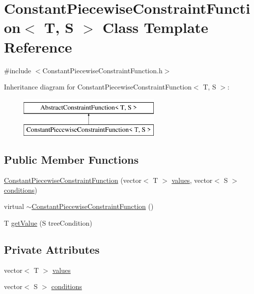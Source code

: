 \hypertarget{class_constant_piecewise_constraint_function}{}\section{Constant\+Piecewise\+Constraint\+Function$<$ T, S $>$ Class Template Reference}
\label{class_constant_piecewise_constraint_function}


{\ttfamily \#include $<$Constant\+Piecewise\+Constraint\+Function.\+h$>$}

Inheritance diagram for Constant\+Piecewise\+Constraint\+Function$<$ T, S $>$\+:\begin{figure}[H]
\begin{center}
\leavevmode
\includegraphics[height=2.000000cm]{d4/d89/class_constant_piecewise_constraint_function}
\end{center}
\end{figure}
\subsection*{Public Member Functions}
\begin{DoxyCompactItemize}
\item 
\hyperlink{class_constant_piecewise_constraint_function_a5f8ebd7b7b8794976f4ddf3a448cd9a6}{Constant\+Piecewise\+Constraint\+Function} (vector$<$ T $>$ \hyperlink{class_constant_piecewise_constraint_function_ae26530a2cd1a3ce9150b68fb16d5423e}{values}, vector$<$ S $>$ \hyperlink{class_constant_piecewise_constraint_function_af28fe38d8c5c4a9a805c8a46d35cd4b2}{conditions})
\item 
virtual \hyperlink{class_constant_piecewise_constraint_function_ab44f248af12827ce5cf528ccf163c2f7}{$\sim$\+Constant\+Piecewise\+Constraint\+Function} ()
\item 
T \hyperlink{class_constant_piecewise_constraint_function_ae44b78e86336e8a45ebac2344d5de8ce}{get\+Value} (S tree\+Condition)
\end{DoxyCompactItemize}
\subsection*{Private Attributes}
\begin{DoxyCompactItemize}
\item 
vector$<$ T $>$ \hyperlink{class_constant_piecewise_constraint_function_ae26530a2cd1a3ce9150b68fb16d5423e}{values}
\item 
vector$<$ S $>$ \hyperlink{class_constant_piecewise_constraint_function_af28fe38d8c5c4a9a805c8a46d35cd4b2}{conditions}
\end{DoxyCompactItemize}


